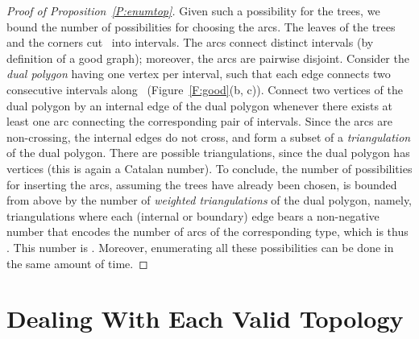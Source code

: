 \documentclass[11pt]{article}
\theoremstyle{plain}  \newtheorem{theorem}{Theorem}[section]
\theoremstyle{definition}
\begin{document}
\begin{proof}[Proof of Proposition~\ref{P:enumtop}]
  Given such a possibility for the trees, we bound the number of
  possibilities for choosing the arcs.  The  leaves of the trees
  and the corners cut~ into  intervals.  The arcs
  connect distinct intervals (by definition of a good graph); moreover, the
  arcs are pairwise disjoint.  Consider the \emph{dual polygon} having one
  vertex per interval, such that each edge connects two consecutive
  intervals along~ (Figure~\ref{F:good}(b, c)).  Connect two vertices
  of the dual polygon by an internal edge of the dual polygon whenever
  there exists at least one arc connecting the corresponding pair of
  intervals.  Since the arcs are non-crossing, the internal edges do not
  cross, and form a subset of a \emph{triangulation} of the dual polygon.
  There are  possible triangulations, since the dual polygon
  has  vertices (this is again a Catalan number).  To conclude, the
  number of possibilities for inserting the arcs, assuming the trees have
  already been chosen, is bounded from above by the number of
  \emph{weighted triangulations} of the dual polygon, namely,
  triangulations where each (internal or boundary) edge bears a
  non-negative number that encodes the number of arcs of the corresponding
  type, which is thus .  This number is .
  Moreover, enumerating all these possibilities can be done in the same
  amount of time.
\end{proof}

\section{Dealing With Each Valid Topology}\label{S:final}
\end{document}
